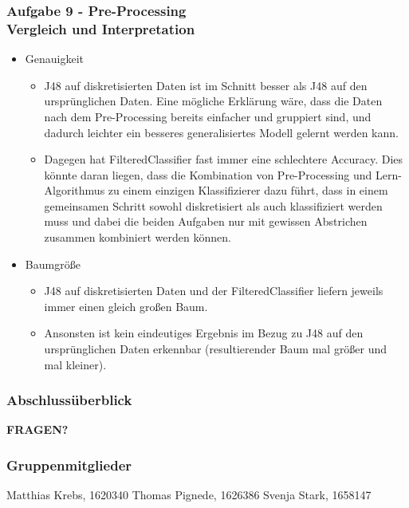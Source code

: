 \documentclass[accentcolor=tud10b,colorbacktitle,inverttitle,landscape,german,presentation,t]{tudbeamer}
\begin{document}
    \begin{frame}[t]
    \frametitle{Aufgabe 9 - Pre-Processing\\ Vergleich und Interpretation}
        \begin{itemize}
            \item Genauigkeit
            \begin{itemize}
                \item J48 auf diskretisierten Daten ist im Schnitt besser als J48 auf den ursprünglichen Daten. Eine mögliche Erklärung wäre, dass die Daten nach dem Pre-Processing bereits einfacher und gruppiert sind, und dadurch leichter ein besseres generalisiertes Modell gelernt werden kann.
                \item Dagegen hat FilteredClassifier fast immer eine schlechtere Accuracy. Dies könnte daran liegen, dass die Kombination von Pre-Processing und Lern-Algorithmus zu einem einzigen Klassifizierer dazu führt, dass in einem gemeinsamen Schritt sowohl diskretisiert als auch klassifiziert werden muss und dabei die beiden Aufgaben nur mit gewissen Abstrichen zusammen kombiniert werden können.
            \end{itemize}
            \item Baumgröße
            \begin{itemize}
                \item J48 auf diskretisierten Daten und der FilteredClassifier liefern jeweils immer einen gleich großen Baum.
                \item Ansonsten ist kein eindeutiges Ergebnis im Bezug zu J48 auf den ursprünglichen Daten erkennbar (resultierender Baum mal größer und mal kleiner).
            \end{itemize}
        \end{itemize}
    \end{frame}

\begin{frame}
\frametitle{Abschlussüberblick}
\tableofcontents
\begin{center}
\textbf{\Large FRAGEN?}
\end{center}
\end{frame}

\begin{frame}
\frametitle{Gruppenmitglieder}
Matthias Krebs, 1620340 \vfill
Thomas Pignede, 1626386 \vfill
Svenja Stark, 1658147
\end{frame}
\end{document}
